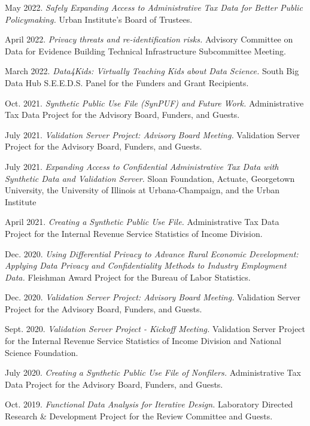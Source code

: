 \begin{etaremune}[topsep=0pt, itemsep=4pt, partopsep=0pt, parsep=0pt]
    \item May 2022. \textit{Safely Expanding Access to Administrative Tax Data for Better Public Policymaking.} Urban Institute's Board of Trustees.
    
    \item April 2022. \textit{Privacy threats and re-identification risks.} Advisory Committee on Data for Evidence Building Technical Infrastructure Subcommittee Meeting.
    
    \item March 2022. \textit{Data4Kids: Virtually Teaching Kids about Data Science.} South Big Data Hub S.E.E.D.S. Panel for the Funders and Grant Recipients.
    
    \item Oct. 2021. \textit{Synthetic Public Use File (SynPUF) and Future Work.} Administrative Tax Data Project for the Advisory Board, Funders, and Guests.
    
    \item July 2021. \textit{Validation Server Project: Advisory Board Meeting.} Validation Server Project for the Advisory Board, Funders, and Guests.
    
    \item July 2021. \textit{Expanding Access to Confidential Administrative Tax Data with Synthetic Data and Validation Server.} Sloan Foundation, Actuate, Georgetown University, the University of Illinois at Urbana-Champaign, and the Urban Institute
    
    \item April 2021. \textit{Creating a Synthetic Public Use File.} Administrative Tax Data Project for the Internal Revenue Service Statistics of Income Division.

    \item Dec. 2020. \textit{Using Differential Privacy to Advance Rural Economic Development: Applying Data Privacy and Confidentiality Methods to Industry Employment Data.} Fleishman Award Project for the Bureau of Labor Statistics.
    
    \item Dec. 2020. \textit{Validation Server Project: Advisory Board Meeting.} Validation Server Project for the Advisory Board, Funders, and Guests.
    
    \item Sept. 2020. \textit{Validation Server Project - Kickoff Meeting.} Validation Server Project for the Internal Revenue Service Statistics of Income Division and National Science Foundation.
    
    \item July 2020. \textit{Creating a Synthetic Public Use File of Nonfilers.} Administrative Tax Data Project for the Advisory Board, Funders, and Guests.
    
    \item Oct. 2019. \textit{Functional Data Analysis for Iterative Design.} Laboratory Directed Research \& Development Project for the Review Committee and Guests.
\end{etaremune}
